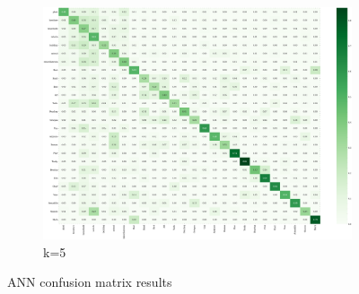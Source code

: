 \begin{figure}
\begin{subfigure}[b]{0.49\textwidth}
        \includegraphics[width=\textwidth]{assets/evaluation_results/ANN/confusion_matrix_k_5.png}
        \caption{k=5}
    \end{subfigure}
    \caption{ANN confusion matrix results}
    \label{fig:ann-confusion-matrix-results}
\end{figure}


